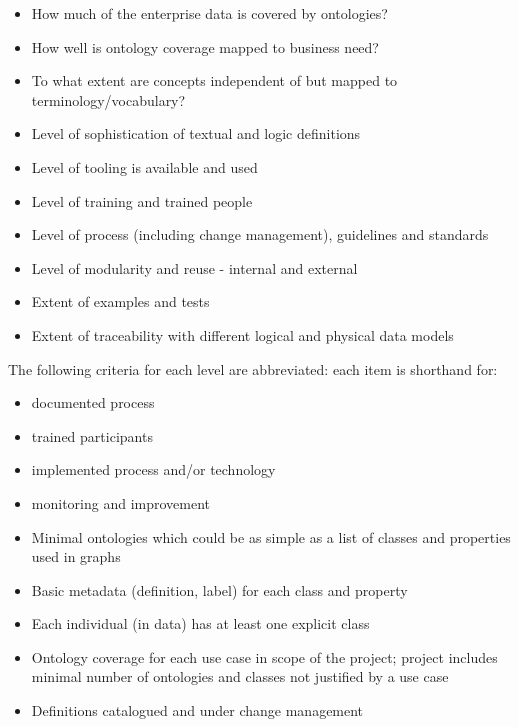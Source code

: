 \begin{itemize}
    \item How much of the enterprise data is covered by ontologies?
    \item How well is ontology coverage mapped to business need?
    \item To what extent are concepts independent of but mapped to terminology/vocabulary?
    \item Level of sophistication of textual and logic definitions
    \item Level of tooling is available and used
    \item Level of training and trained people
    \item Level of process (including change management), guidelines and standards
    \item Level of modularity and reuse - internal and external
    \item Extent of examples and tests
    \item Extent of traceability with different logical and physical data models
\end{itemize}

\ekgmmCapabilitySectionLevels

The following criteria for each level are abbreviated: each item is shorthand for:

\begin{itemize}
    \item documented process
    \item trained participants
    \item implemented process and/or technology
    \item monitoring and improvement
\end{itemize}

\ekgmmCapabilitySectionLevelsOneFive

\ekgmmscoringlevelOne

\begin{itemize}
    \item Minimal ontologies which could be as simple as a list of classes and properties used in graphs
    \item Basic metadata (definition, label) for each class and property
    \item Each individual (in data) has at least one explicit class
    \item Ontology coverage for each use case in scope of the project;
          project includes minimal number of ontologies and classes not justified by a use case
    \item Definitions catalogued and under change management
\end{itemize}

